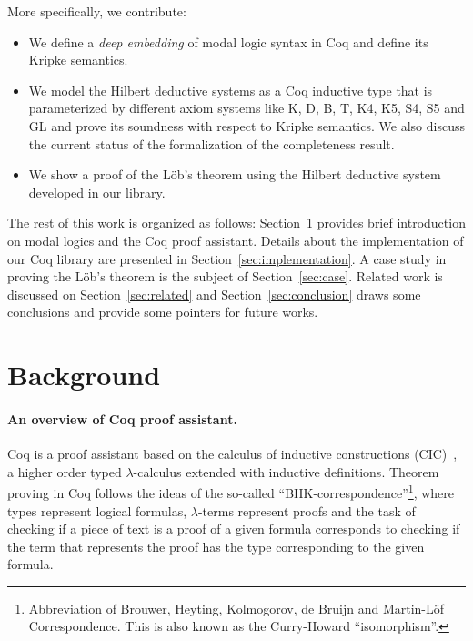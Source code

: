 \documentclass[sigconf]{acmart}
\begin{document}

More specifically, we contribute:

\begin{itemize}
  \item We define a \emph{deep embedding} of modal logic syntax in Coq and
    define its Kripke semantics.
  \item We model the Hilbert deductive systems as a Coq inductive type that is
    parameterized by different axiom systems like K, D, B, T, K4, K5, S4, S5 and GL
    and prove its soundness with respect to Kripke semantics. We also
    discuss the current status of the formalization of the completeness result.
  \item We show a proof of the L\"ob's theorem using the Hilbert deductive system
    developed in our library.
\end{itemize}

The rest of this work is organized as follows: Section~\ref{sec:background} provides
brief introduction on modal logics and the Coq proof assistant. Details about
the implementation of our Coq library are presented in
Section~\ref{sec:implementation}. A case study in proving the L\"ob's theorem is
the subject of Section~\ref{sec:case}. Related work is discussed
on Section~\ref{sec:related} and Section~\ref{sec:conclusion} draws some conclusions and
provide some pointers for future works.

\section{Background}\label{sec:background}

\paragraph{An overview of Coq proof assistant.}

Coq is a proof assistant based on the calculus of inductive
constructions (CIC)~\cite{manual_cic}, a higher order typed
$\lambda$-calculus extended with inductive definitions.  Theorem
proving in Coq follows the ideas of the so-called
``BHK-cor\-res\-pon\-dence''\footnote{Abbreviation of Brouwer, Heyting,
  Kolmogorov, de Bruijn and Martin-L\"of Correspondence. This is also
  known as the Curry-Howard ``isomorphism''.}, where types represent
logical formulas, $\lambda$-terms represent proofs
\cite{Bertot10} and the task of checking if a piece of text is a
proof of a given formula corresponds to checking if the term that
represents the proof has the type corresponding to the given formula.
\end{document}
